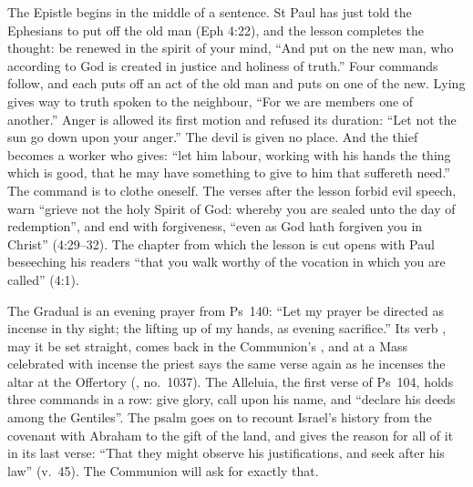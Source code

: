 The Epistle begins in the middle of a sentence. St Paul has just told the
Ephesians to put off the old man (Eph 4:22), and the lesson completes the
thought: be renewed in the spirit of your mind, ``And put on the new man, who
according to God is created in justice and holiness of truth.'' Four commands
follow, and each puts off an act of the old man and puts on one of the new.
Lying gives way to truth spoken to the neighbour, ``For we are members one of
another.'' Anger is allowed its first motion and refused its duration: ``Let
not the sun go down upon your anger.'' The devil is given no place. And the
thief becomes a worker who gives: ``let him labour, working with his hands the
thing which is good, that he may have something to give to him that suffereth
need.'' The command is to clothe oneself. The verses after the lesson forbid
evil speech, warn ``grieve not the holy Spirit of God: whereby you are sealed
unto the day of redemption'', and end with forgiveness, ``even as God hath
forgiven you in Christ'' (4:29--32). The chapter from which the lesson is
cut opens with Paul beseeching his readers ``that you walk worthy of the
vocation in which you are called'' (4:1).

The Gradual is an evening prayer from Ps~140: ``Let my prayer be
directed as incense in thy sight; the lifting up of my hands, as evening
sacrifice.'' Its verb , may it be set straight, comes back in
the Communion's , and at a Mass celebrated with incense the
priest says the same verse again as he incenses the altar at the Offertory
(, no.~1037). The Alleluia, the first verse of Ps~104, holds
three commands in a row: give glory, call upon his name, and ``declare his
deeds among the Gentiles''. The psalm goes on to recount Israel's history
from the covenant with Abraham to the gift of the land, and gives the reason for all of it in its last verse: ``That they might
observe his justifications, and seek after his law'' (v.~45). The Communion
will ask for exactly that.

